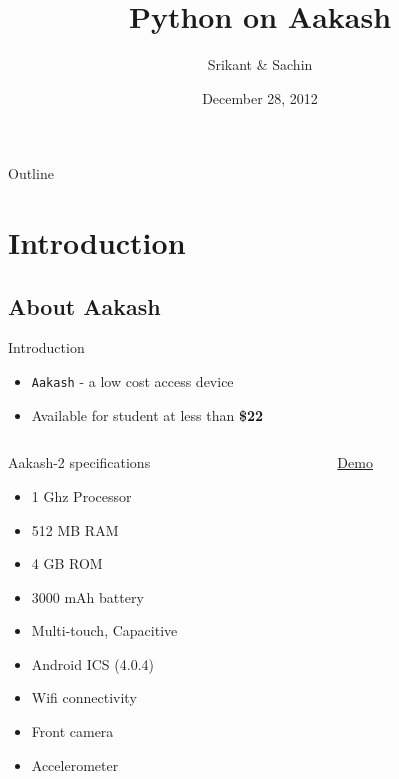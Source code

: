 \documentclass{beamer}
\title[Python on Aakash]{Python on Aakash}
\author{Srikant \& Sachin}
\institute{Indian Institute of Technology, Bombay}
\date{December 28, 2012}
\begin{document}
\begin{frame}
  \titlepage
\end{frame}

\begin{frame}{Outline}
 \tableofcontents
\end{frame}

\section{Introduction}
\subsection{About Aakash}
\begin{frame}{Introduction}
\begin{itemize}
  \item {\tt Aakash} - a low cost access device
  \item Available for student at less than {\bf \$22}
\end{itemize}
\begin{columns}
\begin{column}{.48\textwidth}
\begin{block}{Aakash-2 specifications}
\begin{itemize}
  \item 1 Ghz Processor
  \item 512 MB RAM
  \item 4 GB ROM
  \item 3000 mAh battery
  \item Multi-touch, Capacitive
  \item Android ICS (4.0.4) 
  \item Wifi connectivity
  \item Front camera
  \item Accelerometer
\end{itemize}
\end{block}
\end{column}%
\begin{column}{.20\textwidth}
 \begin{block}{}
  \centerline{\href{file:///home/sachin/Videos/fossin/final.AVI}{Demo}}
 \end{block}
\end{column}%
\end{columns}
\end{frame}
\end{document}
